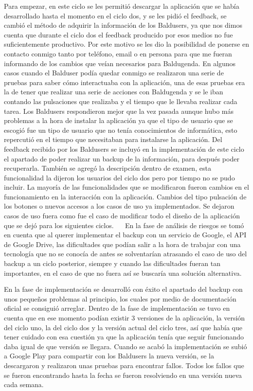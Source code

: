 Para empezar, en este ciclo se les permitió descargar la aplicación que se había desarrollado hasta el momento en el ciclo dos, y se les pidió el feedback, se cambió el método de adquirir la información de los Baldusers, ya que nos dimos cuenta que durante el ciclo dos el feedback producido por esos medios no fue suficientemente productivo. Por este motivo se les dio la posibilidad de ponerse en contacto conmigo tanto por teléfono, email o en persona para que me fueran informando de los cambios que veían necesarios para Baldugenda.
En algunos casos cuando el Balduser podía quedar conmigo se realizaron una serie de pruebas para saber cómo interactuaba con la aplicación, una de esas pruebas era la de tener que realizar una serie de acciones con Baldugenda y se le iban contando las pulsaciones que realizaba y el tiempo que le llevaba realizar cada tarea.
Los Baldusers respondieron mejor que la vez pasada aunque hubo más problemas a la hora de instalar la aplicación ya que el tipo de usuario que se escogió fue un tipo de usuario que no tenía conocimientos de informática, esto repercutió en el tiempo que necesitaban para instalarse la aplicación. Del feedback recibido por los Baldusers se incluyó en la implementación de este ciclo el apartado de poder realizar un backup de la información, para después poder recuperarla. También se agregó la descripción dentro de examen, esta funcionalidad la dijeron los usuarios del ciclo dos pero por tiempo no se pudo incluir. La mayoría de las funcionalidades que se modificaron fueron cambios en el funcionamiento en la interacción con la aplicación. Cambios del tipo pulsación de los botones o nuevos accesos a los casos de uso ya implementados. Se dejaron casos de uso fuera como fue el caso de modificar todo el diseño de la aplicación que se dejó para los siguientes ciclos.
 
En la fase de análisis de riesgos se tomó en cuenta que al querer implementar el backup con un servicio de Google, el API de Google Drive,  las dificultades que podían salir a la hora de trabajar con una tecnología que no se conocía de antes se solventarían atrasando el caso de uso del backup a un ciclo posterior, siempre y cuando las dificultades fueran tan importantes, en el caso de que no fuera así se buscaría una solución alternativa.

En la fase de implementación se desarrolló con éxito el apartado del backup con unos pequeños problemas al principio, los cuales por medio de documentación oficial se consiguió arreglar. Dentro de la fase de implementación se tuvo en cuenta que en ese momento podían existir 3 versiones de la aplicación, la versión del ciclo uno, la del ciclo dos y la versión actual del ciclo tres, así que había que tener cuidado con esa cuestión ya que la aplicación tenía que seguir funcionando daba igual de que versión se llegara. Cuando se acabó la implementación se subió a Google Play para compartir con los Baldusers la nueva versión, se la descargaron y realizaron unas pruebas para encontrar fallos. Todos los fallos que se fueron encontrando hasta la fecha se fueron resolviendo en una versión nueva cada semana.

